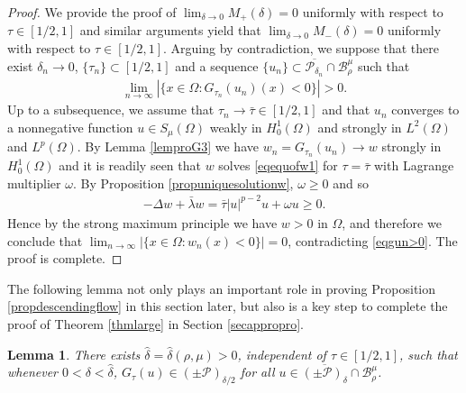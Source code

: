 \documentclass[10pt,a4paper]{article}
\newtheorem{lemma}[theorem]{Lemma}
\theoremstyle{definition} \theoremstyle{remark}
\numberwithin{equation}{section}
\newcommand{\B}{\mathcal{B}}
\newcommand{\p}{\mathcal{P}}
\newcommand{\la}{\lambda}
\begin{document}
\begin{proof}
	We provide the proof of $\lim_{\delta \to 0}M_{+}(\delta) = 0$ uniformly with respect to $\tau \in [1/2,1]$ and similar arguments yield that $\lim_{\delta \to 0}M_{-}(\delta) = 0$ uniformly with respect to $\tau \in [1/2,1]$. Arguing by contradiction, we suppose that there exist $\delta_n \to 0$, $\{\tau_n\} \subset [1/2,1]$ and a sequence $\{u_n\} \subset \overline{\p_{\delta_n}} \cap \B_\rho^\mu$ such that
	\begin{align} \label{eqgun>0}
		\lim_{n \to \infty}|\{x \in \Omega: G_{\tau_n}(u_n)(x) < 0\}| > 0.
	\end{align}
	Up to a subsequence, we assume that $\tau_n \to \bar\tau \in [1/2,1]$ and that $u_n$ converges to a nonnegative function $u \in S_\mu(\Omega)$ weakly in $H_0^1(\Omega)$ and strongly in $L^2(\Omega)$ and $L^p(\Omega)$. By Lemma \ref{lemproG3} we have $w_n = G_{\tau_n}(u_n) \to w$ strongly in $H_0^1(\Omega)$ and it is readily seen that $w$ solves \eqref{eqequofw1} for $\tau = \bar \tau$ with Lagrange multiplier $\omega$. By Proposition \ref{propuniquesolutionw}, $\omega \ge 0$ and so
	\begin{align*}
		-\Delta w + \bar \la w = \bar\tau |u|^{p-2}u + \omega u \geq 0.
	\end{align*}
	Hence by the strong maximum principle we have $w > 0$ in $\Omega$, and therefore we conclude that $\lim_{n \to \infty}|\{x \in \Omega: w_n(x) < 0\}| = 0$, contradicting \eqref{eqgun>0}. The proof is complete.
\end{proof}

The following lemma not only plays an important role in proving Proposition \ref{propdescendingflow} in this section later, but also is a key step to complete the proof of Theorem \ref{thmlarge} in Section \ref{secappropro}.

\begin{lemma} \label{lemproG4}
    There exists $\hat \delta = \hat\delta(\rho,\mu) > 0$, independent of $\tau \in [1/2,1]$, such that whenever $0 < \delta < \hat\delta$, $G_\tau(u) \in (\pm\p)_{\delta/2}$ for all $u \in \overline{(\pm\p)_\delta} \cap \B_\rho^\mu$.
\end{lemma}
\end{document}
